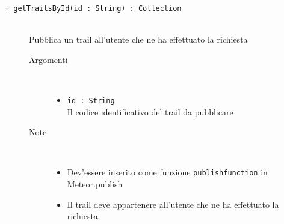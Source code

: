 \begin{description}
	\begin{description}
		\item[\texttt{+ getTrailsById(id : String) : Collection			}] \hfill \\
			Pubblica un trail all'utente che ne ha effettuato la richiesta
			
		\begin{description}
			\item[Argomenti] \hfill \\
				\begin{itemize}
				
					\item \texttt{id : String			} \hfill \\
					Il codice identificativo del trail da pubblicare
					
				\end{itemize}
			\item[Note] \hfill \\
			\begin{itemize}
					\item Dev'essere inserito come funzione \texttt{publishfunction} in Meteor.publish
					\item Il trail deve appartenere all'utente che ne ha effettuato la richiesta
				\end{itemize}
		\end{description}
	\end{description}
	
	
	
	
\end{description}